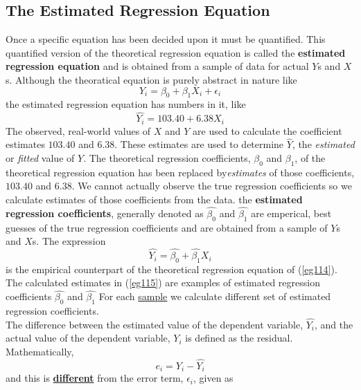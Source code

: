 \documentclass[11pt]{article}
\begin{document}
\subsection{The Estimated Regression Equation}
Once a specific equation has been decided upon it must be quantified. This quantified version of the theoretical regression equation is called the \textbf{estimated regression equation} and is obtained from a sample of data for actual $Y$s and $X$s. Although the theoratical equation is purely abstract in nature like
\begin{equation}
Y_i = \beta_0 + \beta_1 X_i + \epsilon_i \label{eg1_14}
\end{equation}
the estimated regression equation has numbers in it, like
\begin{equation}
\hat{Y_i} = 103.40 + 6.38X_i \label{eg1_15}
\end{equation}
The observed, real-world values of $X$ and $Y$ are used to calculate the coefficient estimates $103.40$ and $6.38$. These estimates are used to determine $\hat{Y}$, the \textit{estimated} or \textit{fitted} value of $Y$. The theoretical regression coefficients, $\beta_0$ and $\beta_1$, of the theoretical regression equation has been replaced by\textit{estimates} of those coefficients, $103.40$ and $6.38$. We cannot actually observe the true regression coefficients so we calculate estimates of those coefficients from the data. the \textbf{estimated regression coefficients}, generally denoted as $\hat{\beta_0}$ and $\hat{\beta_1}$ are emperical, best guesses of the true regression coefficients and are obtained from a sample of $Y$s and $X$s. The expression
\begin{equation}
\hat{Y_i} = \hat{\beta_0} + \hat{\beta_1}X_i \label{eg1_16}
\end{equation}
is the empirical counterpart of the theoretical regression equation of (\ref{eg114}). The calculated estimates in (\ref{eg115}) are examples of estimated regression coefficients $\hat{\beta_0}$ and $\hat{\beta_1}$ For each \underline{sample} we calculate different set of estimated regression coefficients.\\
The difference between the estimated value of the dependent variable, $\hat{Y_i}$, and the actual value of the dependent variable, $Y_i$ is defined as the residual. Mathematically, 
\begin{equation}
e_i= Y_i - \hat{Y_i} \label{eg1_17}
\end{equation}
and this is \textbf{\underline{different}} from the error term, $\epsilon_i$, given as
\end{document}
